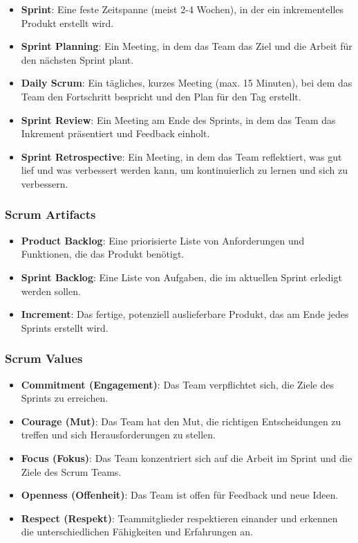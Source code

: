 \begin{itemize}
    \item \textbf{Sprint}: Eine feste Zeitspanne (meist 2-4 Wochen), in der ein inkrementelles Produkt erstellt wird.
    \item \textbf{Sprint Planning}: Ein Meeting, in dem das Team das Ziel und die Arbeit für den nächsten Sprint plant.
    \item \textbf{Daily Scrum}: Ein tägliches, kurzes Meeting (max. 15 Minuten), bei dem das Team den Fortschritt bespricht und den Plan für den Tag erstellt.
    \item \textbf{Sprint Review}: Ein Meeting am Ende des Sprints, in dem das Team das Inkrement präsentiert und Feedback einholt.
    \item \textbf{Sprint Retrospective}: Ein Meeting, in dem das Team reflektiert, was gut lief und was verbessert werden kann, um kontinuierlich zu lernen und sich zu verbessern.
\end{itemize}

\subsubsection{Scrum Artifacts}

\begin{itemize}
    \item \textbf{Product Backlog}: Eine priorisierte Liste von Anforderungen und Funktionen, die das Produkt benötigt.
    \item \textbf{Sprint Backlog}: Eine Liste von Aufgaben, die im aktuellen Sprint erledigt werden sollen.
    \item \textbf{Increment}: Das fertige, potenziell auslieferbare Produkt, das am Ende jedes Sprints erstellt wird.
\end{itemize}

\subsubsection{Scrum Values}

\begin{itemize}
    \item \textbf{Commitment (Engagement)}: Das Team verpflichtet sich, die Ziele des Sprints zu erreichen.
    \item \textbf{Courage (Mut)}: Das Team hat den Mut, die richtigen Entscheidungen zu treffen und sich Herausforderungen zu stellen.
    \item \textbf{Focus (Fokus)}: Das Team konzentriert sich auf die Arbeit im Sprint und die Ziele des Scrum Teams.
    \item \textbf{Openness (Offenheit)}: Das Team ist offen für Feedback und neue Ideen.
    \item \textbf{Respect (Respekt)}: Teammitglieder respektieren einander und erkennen die unterschiedlichen Fähigkeiten und Erfahrungen an.
\end{itemize}

